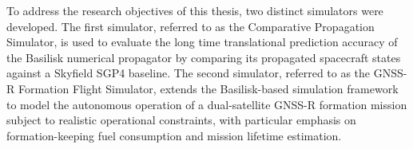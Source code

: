 To address the research objectives of this thesis, two distinct simulators were developed. The first simulator, referred to as the Comparative Propagation Simulator, is used to evaluate the long time translational prediction accuracy of the Basilisk numerical propagator by comparing its propagated spacecraft states against a Skyfield SGP4 baseline. The second simulator, referred to as the GNSS-R Formation Flight Simulator, extends the Basilisk-based simulation framework to model the autonomous operation of a dual-satellite GNSS-R formation mission subject to realistic operational constraints, with particular emphasis on formation-keeping fuel consumption and mission lifetime estimation. 

